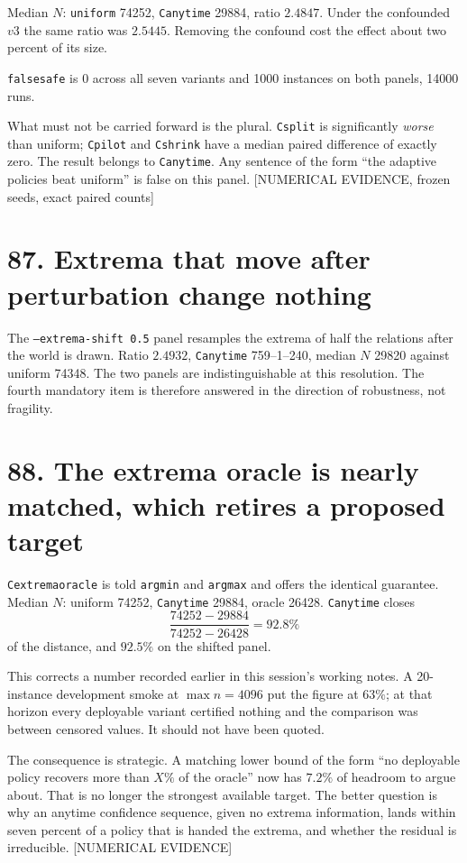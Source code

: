 \documentclass[9pt,twocolumn]{article}
\newcommand{\eclass}[1]{\textsf{[#1]}}
\renewcommand{\_}{\CIGunderscore\allowbreak}
\begin{document}
Median $N$: \texttt{uniform} 74252, \texttt{C\_anytime} 29884, ratio $2.4847$. Under the confounded $v3$ the same ratio was $2.5445$. Removing the confound cost the effect about two percent of its size.

\texttt{false\_safe} is $0$ across all seven variants and 1000 instances on both panels, 14000 runs.

What must not be carried forward is the plural. \texttt{C\_split} is significantly \emph{worse} than uniform; \texttt{C\_pilot} and \texttt{C\_shrink} have a median paired difference of exactly zero. The result belongs to \texttt{C\_anytime}. Any sentence of the form ``the adaptive policies beat uniform'' is false on this panel. \eclass{NUMERICAL EVIDENCE, frozen seeds, exact paired counts}

\section*{87. Extrema that move after perturbation change nothing}

The \texttt{--extrema-shift 0.5} panel resamples the extrema of half the relations after the world is drawn. Ratio $2.4932$, \texttt{C\_anytime} 759--1--240, median $N$ 29820 against uniform 74348. The two panels are indistinguishable at this resolution. The fourth mandatory item is therefore answered in the direction of robustness, not fragility.

\section*{88. The extrema oracle is nearly matched, which retires a proposed target}

\texttt{C\_extrema\_oracle} is told \texttt{argmin} and \texttt{argmax} and offers the identical guarantee. Median $N$: uniform 74252, \texttt{C\_anytime} 29884, oracle 26428. \texttt{C\_anytime} closes
\[ \frac{74252-29884}{74252-26428}=92.8\% \]
of the distance, and $92.5\%$ on the shifted panel.

This corrects a number recorded earlier in this session's working notes. A 20-instance development smoke at $\max n = 4096$ put the figure at $63\%$; at that horizon every deployable variant certified nothing and the comparison was between censored values. It should not have been quoted.

The consequence is strategic. A matching lower bound of the form ``no deployable policy recovers more than $X\%$ of the oracle'' now has $7.2\%$ of headroom to argue about. That is no longer the strongest available target. The better question is why an anytime confidence sequence, given no extrema information, lands within seven percent of a policy that is handed the extrema, and whether the residual is irreducible. \eclass{NUMERICAL EVIDENCE}
\end{document}
